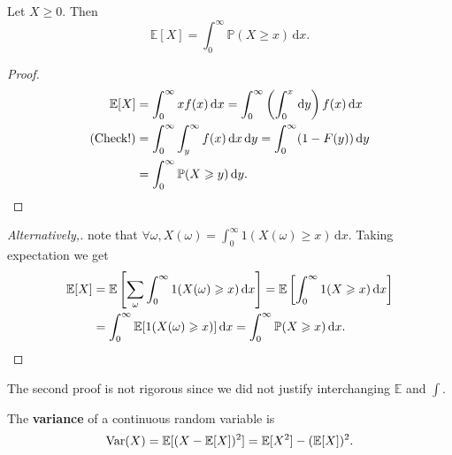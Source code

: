 \begin{proposition}
    Let $X\ge 0$. Then 
    \[
        \mathbb{E}[X] = \int_{0}^{\infty} \mathbb{P}(X\ge x) \,\mathrm{d}x.
    \]
\end{proposition}
\begin{proof}
    \begin{align*}
        \mathbb{E}[X]&= \int_{0}^{\infty} xf(x) \,\mathrm{d}x=\int_{0}^{\infty} \left( \int_{0}^{x}  \,\mathrm{d}y \right)f(x) \,\mathrm{d}x\\ 
        \text{(Check!)}&= \int_{0}^{\infty} \int_{y}^{\infty} f(x) \,\mathrm{d}x \,\mathrm{d}y = \int_{0}^{\infty} (1-F(y)) \,\mathrm{d}y\\ 
        &= \int_{0}^{\infty} \mathbb{P}(X\ge y) \,\mathrm{d}y.\qedhere
    \end{align*}
\end{proof}
\begin{proof}[Alternatively,]
    note that $ \forall \omega, X(\omega)=\int_{0}^{\infty} 1(X(\omega)\ge x) \,\mathrm{d}x $. Taking expectation we get 
    \begin{align*}
        \mathbb{E}[X] &= \mathbb{E}\left[ \sum_{\omega}\int_{0}^{\infty} 1(X(\omega)\ge x) \,\mathrm{d}x \right] = \mathbb{E}\left[ \int_{0}^{\infty} 1(X\ge x) \,\mathrm{d}x \right]\\
        &= \int_{0}^{\infty} \mathbb{E}[1(X(\omega)\ge x)] \,\mathrm{d}x = \int_{0}^{\infty} \mathbb{P}(X\ge x) \,\mathrm{d}x.\qedhere
    \end{align*}
\end{proof}
\begin{remark}
    The second proof is not rigorous since we did not justify interchanging $ \mathbb{E} $ and $ \int $.
\end{remark}

\begin{definition}[Variance]
    The \textbf{variance} of a continuous random variable is
    \[
        \var(X) = \mathbb{E}[(X-\mathbb{E}[X])^2] = \mathbb{E}[X^2]-(\mathbb{E}[X])^2.
    \]
\end{definition}

